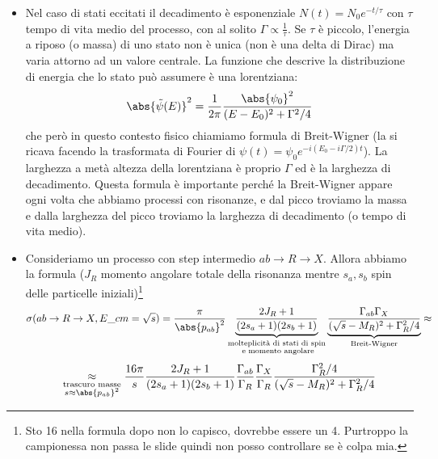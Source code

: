 \begin{itemize}
        \item Nel caso di stati eccitati il decadimento è esponenziale $N(t)=N_0e^{-t/\tau}$ con $\tau$ tempo di vita medio del processo, con al solito $\Gamma\propto\frac1\tau$. Se $\tau$ è piccolo, l'energia a riposo (o massa) di uno stato non è unica (non è una delta di Dirac) ma varia attorno ad un valore centrale. La funzione che descrive la distribuzione di energia che lo stato può assumere è una lorentziana:
        \begin{equation*}
            \abs{\tilde\psi(E)}^2=\frac1{2\pi}\frac{\abs{\psi_0}^2}{(E-E_0)^2+\Gamma^2/4}
        \end{equation*} 
        che però in questo contesto fisico chiamiamo formula di Breit-Wigner (la si ricava facendo la trasformata di Fourier di $\psi(t)=\psi_0e^{-i(E_0-i\Gamma/2)t}$). La larghezza a metà altezza della lorentziana è proprio $\Gamma$ ed è la larghezza di decadimento. Questa formula è importante perché la Breit-Wigner appare ogni volta che abbiamo processi con risonanze, e dal picco troviamo la massa e dalla larghezza del picco troviamo la larghezza di decadimento (o tempo di vita medio).
        \item Consideriamo un processo con step intermedio $ab\to R\to X$. Allora abbiamo la formula ($J_R$ momento angolare totale della risonanza mentre $s_a,s_b$ spin delle particelle iniziali)\footnote{Sto 16 nella formula dopo non lo capisco, dovrebbe essere un 4. Purtroppo la campionessa non passa le slide quindi non posso controllare se è colpa mia.}
        \begin{equation*}
            \sigma(ab\to R\to X, E\_{cm}=\sqrt s)=\frac\pi{\abs{p_{ab}}^2}\underbrace{\frac{2J_R+1}{(2s_a+1)(2s_b+1)}}_{\begin{subarray}{c}
                \text{molteplicità di stati di spin}\\
                \text{ e momento angolare}
             \end{subarray}}\underbrace{\frac{\Gamma_{ab}\Gamma_X}{(\sqrt s-M_R)^2+\Gamma_R^2/4}}_{\text{Breit-Wigner}}\approx
        \end{equation*}
        \begin{equation*}
            \underset{\begin{subarray}{c}
            \text{trascuro masse}\\
            s\approx \abs{p_{ab}}^2
         \end{subarray}}{\approx}\frac{16\pi}s \frac{2J_R+1}{(2s_a+1)(2s_b+1)}\frac{\Gamma_{ab}}{\Gamma_R}\frac{\Gamma_X}{\Gamma_R}\frac{\Gamma_R^2/4}{(\sqrt s-M_R)^2+\Gamma_R^2/4}

\end{equation*}
\end{itemize}
